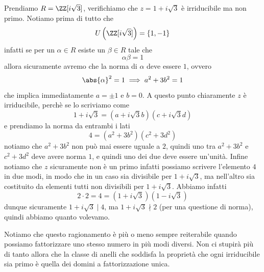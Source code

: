 \documentclass[11pt]{scrartcl}
\begin{document}
	\begin{example}
		Prendiamo $R=\ZZ[i\sqrt{3}]$, verifichiamo che $z=1+i\sqrt{3}$ è irriducibile ma non primo. Notiamo prima di tutto che 
		$$U\left(\ZZ[i\sqrt{3}]\right)=\left\{1,-1\right\}$$
		infatti se per un $\alpha\in R$ esiste un $\beta\in R$ tale che 
		$$\alpha\beta=1$$
		allora sicuramente avremo che la norma di $\alpha$ deve essere $1$, ovvero
		$$\abs{\alpha}^2=1 \implies a^2+3b^2=1$$
		che implica immediatamente $a=\pm 1$ e $b=0$. A questo punto chiaramente $z$ è irriducibile, perchè se lo scriviamo come
		$$1+i\sqrt{3}=(a+i\sqrt{3}b)(c+i\sqrt{3}d)$$
		e prendiamo la norma da entrambi i lati
		$$4=(a^2+3b^2)(c^2+3d^2)$$
		notiamo che $a^2+3b^2$ non può mai essere uguale a $2$, quindi uno tra $a^2+3b^2$ e $c^2+3d^2$ deve avere norma $1$, e quindi uno dei due deve essere un'unità. Infine notiamo che $z$ sicuramente non è un primo infatti possiamo scrivere l'elemento $4$ in due modi, in modo che in un caso sia divisibile per $1+i\sqrt{3}$, ma nell'altro sia costituito da elementi tutti non divisibili per $1+i\sqrt{3}$. Abbiamo infatti
		$$2\cdot 2 = 4 = \left(1+i\sqrt{3}\right)\left(1-i\sqrt{3}\right)$$
		dunque sicuramente $1+i\sqrt{3}\mid 4$, ma $1+i\sqrt{3}\nmid 2$ (per una questione di norma), quindi abbiamo quanto volevamo.
	\end{example}
	Notiamo che questo ragionamento è più o meno sempre reiterabile quando possiamo fattorizzare uno stesso numero in più modi diversi. Non ci stupirà più di tanto allora che la classe di anelli che soddisfa la proprietà che ogni irriducibile sia primo è quella dei domini a fattorizzazione unica.
\end{document}
